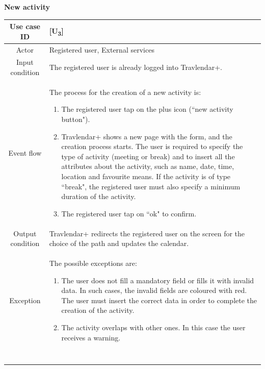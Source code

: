 \documentclass[12pt,titlepage]{article}
\begin{document}
\clearpage
\newpage
 
\begin{flushleft}
\textbf{New activity}
\end{flushleft}


\begin{tabular}{cp{10cm}} 
Use case ID& {[U\textsubscript{3}]}\\ \hline
Actor&Registered user, External services\\ \hline 
Input condition&The registered user is already logged into Travlendar+.\\ \hline
Event flow&The process for the creation of a new activity is: \begin{enumerate}
\item The registered user tap on the plus icon (``new activity button").
\item Travlendar+ shows a new page with the form, and the creation process starts. The user is required to specify the type of activity (meeting or break) and to insert all the attributes about the activity, such as name, date, time, location and favourite means. If the activity is of type ``break", the registered user must also specify a minimum duration of the activity.
\item The registered user tap on ``ok" to confirm.


\end{enumerate} \\ \hline
Output condition& Travlendar+ redirects the registered user on the screen for the choice of the path and updates the calendar. 
\\ \hline
Exception& The possible exceptions are:
\begin{enumerate}

\item The user does not fill a mandatory field or fills it with invalid data. In such cases, the invalid fields are coloured with red. The user must insert the correct data in order to complete the creation of the activity.
\item The activity overlaps with other ones. In this case the user receives a warning.
\end{enumerate}
\\ \hline \

\end{tabular}
\pagebreak
\end{document}
